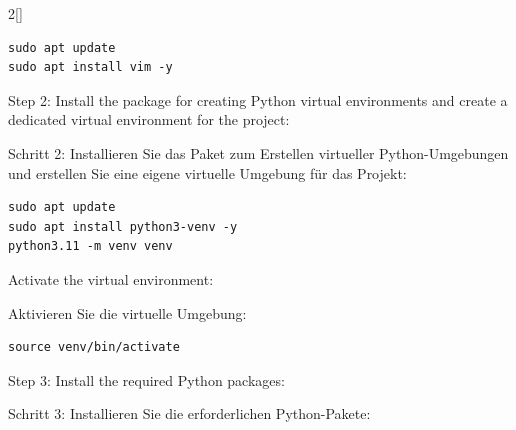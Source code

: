 \begin{paracol}{2}[]
\begin{lstlisting}[style=shell]
sudo apt update 
sudo apt install vim -y
\end{lstlisting}

\colstart

Step 2: Install the package for creating Python virtual environments and create a dedicated virtual environment for the project:

\colger

Schritt 2: Installieren Sie das Paket zum Erstellen virtueller Python-Umgebungen und erstellen Sie eine eigene virtuelle Umgebung für das Projekt:

\colende


\begin{lstlisting}[style=shell]
sudo apt update 
sudo apt install python3-venv -y 
python3.11 -m venv venv
\end{lstlisting}

\colstart

Activate the virtual environment:

\colger

Aktivieren Sie die virtuelle Umgebung:

\colende


\begin{lstlisting}[style=shell]
source venv/bin/activate
\end{lstlisting}

\colstart

Step 3: Install the required Python packages:

\colger

Schritt 3: Installieren Sie die erforderlichen Python-Pakete:

\colende


\end{paracol}
